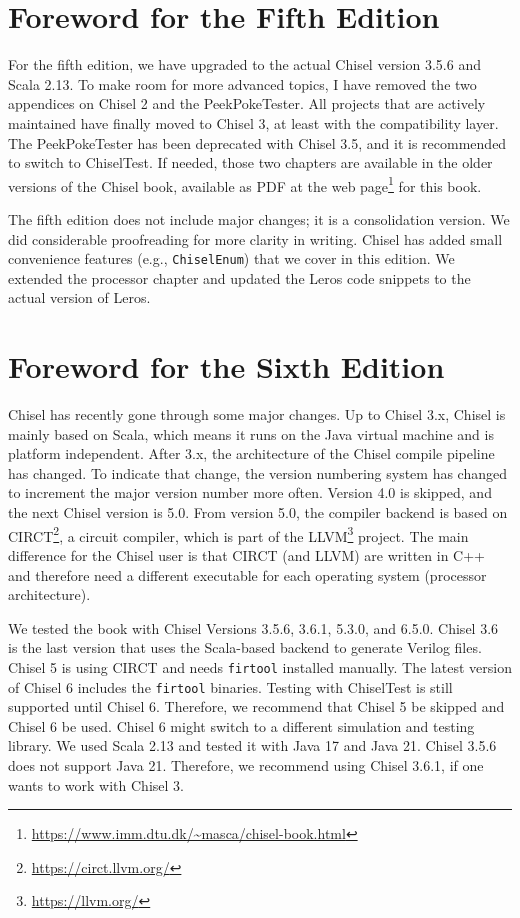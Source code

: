 \documentclass[%
    10pt,
    headinclude, footexclude,
    openright, %
    notitlepage,
    cleardoubleempty,
    headsepline,
    pointlessnumbers,
    bibtotoc, idxtotoc,
    ]{scrbook}
\newcommand{\code}[1]{{\lstinline[basicstyle=\small\ttfamily]{#1}}}
\newcommand{\myref}[2]{\href{#1}{#2}}
\renewcommand{\myref}[2]{{#2}{\footnote{\url{#1}}}}
\begin{document}
\section*{Foreword for the Fifth Edition}

For the fifth edition, we have upgraded to the actual Chisel version 3.5.6 and Scala 2.13.
To make room for more advanced topics, I have removed the two appendices on
Chisel 2 and the PeekPokeTester. All projects that are actively maintained have finally
moved to Chisel 3, at least with the compatibility layer. The PeekPokeTester has been
deprecated with Chisel 3.5, and it is recommended to switch to ChiselTest.
If needed, those two chapters are available in the older versions of the Chisel book, available as PDF at the \myref{https://www.imm.dtu.dk/~masca/chisel-book.html}{web page} for this book.

The fifth edition does not include major changes; it is a consolidation version.
We did considerable proofreading for more clarity in writing. Chisel has added small convenience
features (e.g., \code{ChiselEnum}) that we cover in this edition.
We extended the processor chapter and updated the Leros code snippets
to the actual version of Leros.


\section*{Foreword for the Sixth Edition}


Chisel has recently gone through some major changes. Up to Chisel 3.x, Chisel is mainly
based on Scala, which means it runs on the Java virtual machine and is platform independent.
After 3.x, the architecture of the Chisel compile pipeline has changed. To indicate that change,
the version numbering system has changed to increment the major version number more often.
Version 4.0 is skipped, and the next Chisel version is 5.0.
From version 5.0, the compiler backend is based on \myref{https://circt.llvm.org/}{CIRCT},
a circuit compiler, which is part of the \myref{https://llvm.org/}{LLVM} project.
The main difference for the Chisel user is that CIRCT (and LLVM) are written in C++
and therefore need a different executable for each operating system (processor
architecture).


We tested the book with Chisel Versions 3.5.6, 3.6.1, 5.3.0, and 6.5.0.
Chisel 3.6 is the last version that uses the Scala-based backend to generate Verilog files.
Chisel 5 is using CIRCT and needs \code{firtool} installed manually.
The latest version of Chisel 6 includes the \code{firtool} binaries.
Testing with ChiselTest is still supported until Chisel 6.
Therefore, we recommend that Chisel 5 be skipped and Chisel 6 be used.
Chisel 6 might switch to a different simulation and testing library.
We used Scala 2.13 and tested it with Java 17 and Java 21.
Chisel 3.5.6 does not support Java 21. Therefore, we recommend using Chisel
3.6.1, if one wants to work with Chisel 3.
\end{document}
